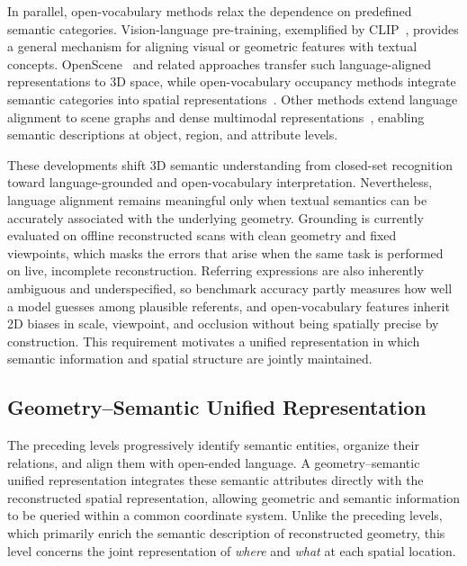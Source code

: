 \documentclass{SCIS2026}
\begin{document}
In parallel, open-vocabulary methods relax the dependence on predefined semantic categories. Vision-language pre-training, exemplified by CLIP~\cite{radford2021clip}, provides a general mechanism for aligning visual or geometric features with textual concepts. OpenScene~\cite{peng2023openscene} and related approaches transfer such language-aligned representations to 3D space, while open-vocabulary occupancy methods integrate semantic categories into spatial representations~\cite{jiang2024openocc}. Other methods extend language alignment to scene graphs and dense multimodal representations~\cite{werby2024hierarchical,li2024dense}, enabling semantic descriptions at object, region, and attribute levels.

These developments shift 3D semantic understanding from closed-set recognition toward language-grounded and open-vocabulary interpretation. Nevertheless, language alignment remains meaningful only when textual semantics can be accurately associated with the underlying geometry. Grounding is currently evaluated on offline reconstructed scans with clean geometry and fixed viewpoints, which masks the errors that arise when the same task is performed on live, incomplete reconstruction. Referring expressions are also inherently ambiguous and underspecified, so benchmark accuracy partly measures how well a model guesses among plausible referents, and open-vocabulary features inherit 2D biases in scale, viewpoint, and occlusion without being spatially precise by construction. This requirement motivates a unified representation in which semantic information and spatial structure are jointly maintained.

\subsection{Geometry--Semantic Unified Representation}

The preceding levels progressively identify semantic entities, organize their relations, and align them with open-ended language. A geometry--semantic unified representation integrates these semantic attributes directly with the reconstructed spatial representation, allowing geometric and semantic information to be queried within a common coordinate system. Unlike the preceding levels, which primarily enrich the semantic description of reconstructed geometry, this level concerns the joint representation of \emph{where} and \emph{what} at each spatial location.
\end{document}

